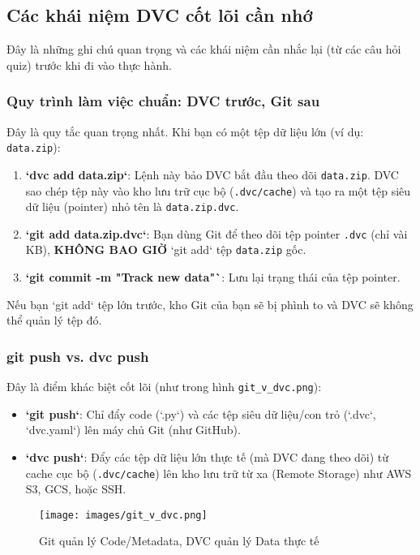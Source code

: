 \documentclass[11pt]{article}
\begin{document}
\subsection{Các khái niệm DVC cốt lõi cần nhớ}
Đây là những ghi chú quan trọng và các khái niệm cần nhắc lại (từ các câu hỏi quiz) trước khi đi vào thực hành.

\subsubsection{Quy trình làm việc chuẩn: DVC trước, Git sau}
Đây là quy tắc quan trọng nhất. Khi bạn có một tệp dữ liệu lớn (ví dụ: \texttt{data.zip}):
\begin{enumerate}
    \item \textbf{`dvc add data.zip`}: Lệnh này bảo DVC bắt đầu theo dõi \texttt{data.zip}. DVC sao chép tệp này vào kho lưu trữ cục bộ (\texttt{.dvc/cache}) và tạo ra một tệp siêu dữ liệu (pointer) nhỏ tên là \texttt{data.zip.dvc}.
    \item \textbf{`git add data.zip.dvc`}: Bạn dùng Git để theo dõi tệp pointer \texttt{.dvc} (chỉ vài KB), \textbf{KHÔNG BAO GIỜ} `git add` tệp \texttt{data.zip} gốc.
    \item \textbf{`git commit -m "Track new data"`}: Lưu lại trạng thái của tệp pointer.
\end{enumerate}
Nếu bạn `git add` tệp lớn trước, kho Git của bạn sẽ bị phình to và DVC sẽ không thể quản lý tệp đó.

\subsubsection{git push vs. dvc push}
Đây là điểm khác biệt cốt lõi (như trong hình \texttt{git\_v\_dvc.png}):
\begin{itemize}
    \item \textbf{`git push`}: Chỉ đẩy code (`.py`) và các tệp siêu dữ liệu/con trỏ (`.dvc`, `dvc.yaml`) lên máy chủ Git (như GitHub).
    \item \textbf{`dvc push`}: Đẩy các tệp dữ liệu lớn thực tế (mà DVC đang theo dõi) từ cache cục bộ (\texttt{.dvc/cache}) lên kho lưu trữ từ xa (Remote Storage) như AWS S3, GCS, hoặc SSH.
\end{itemize}

\begin{figure}[H]
    \centering
    \texttt{[image: images/git\_v\_dvc.png]}
    \caption{Git quản lý Code/Metadata, DVC quản lý Data thực tế}
\end{figure}
\end{document}
